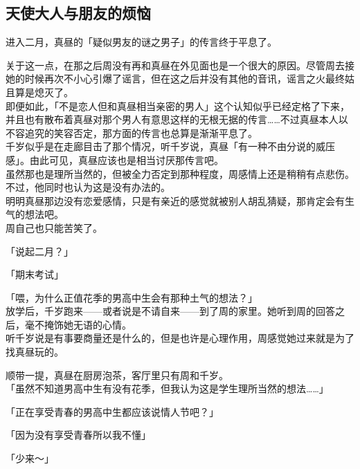 \subsection{天使大人与朋友的烦恼}

进入二月，真昼的「疑似男友的谜之男子」的传言终于平息了。

关于这一点，在那之后周没有再和真昼在外见面也是一个很大的原因。尽管周去接她的时候再次不小心引爆了谣言，但在这之后并没有其他的音讯，谣言之火最终姑且算是熄灭了。\\

即便如此，「不是恋人但和真昼相当亲密的男人」这个认知似乎已经定格了下来，并且也有散布着真昼对那个男人有意思这样的无根无据的传言……不过真昼本人以不容追究的笑容否定，那方面的传言也总算是渐渐平息了。\\

千岁似乎是在走廊目击了那个情况，听千岁说，真昼「有一种不由分说的威压感」。由此可见，真昼应该也是相当讨厌那传言吧。\\

虽然那也是理所当然的，但被全力否定到那种程度，周感情上还是稍稍有点悲伤。不过，他同时也认为这是没有办法的。\\

明明真昼那边没有恋爱感情，只是有亲近的感觉就被别人胡乱猜疑，那肯定会有生气的想法吧。\\

周自己也只能苦笑了。\\

\vspace{2\baselineskip}

「说起二月？」

「期末考试」

「喂，为什么正值花季的男高中生会有那种土气的想法？」\\

放学后，千岁跑来——或者说是不请自来——到了周的家里。她听到周的回答之后，毫不掩饰她无语的心情。\\

听千岁说是有事要商量还是什么的，但是也许是心理作用，周感觉她过来就是为了找真昼玩的。

顺带一提，真昼在厨房泡茶，客厅里只有周和千岁。\\

「虽然不知道男高中生有没有花季，但我认为这是学生理所当然的想法……」

「正在享受青春的男高中生都应该说情人节吧？」

「因为没有享受青春所以我不懂」

「少来～」\\

